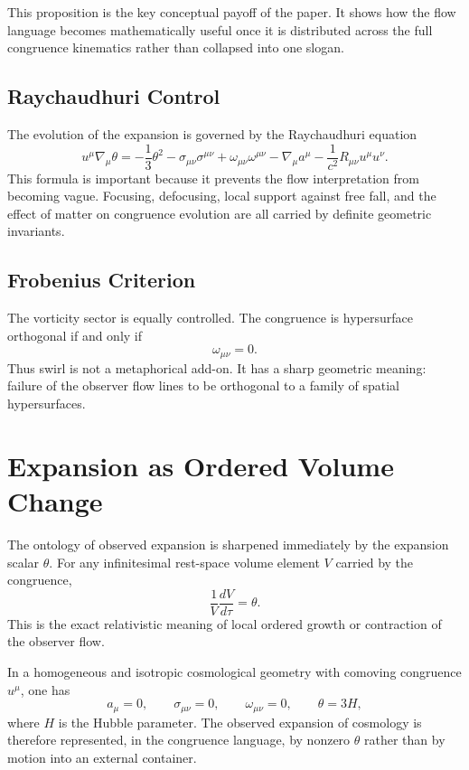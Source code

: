 \documentclass[11pt]{article}
\begin{document}
This proposition is the key conceptual payoff of the paper. It shows how the flow language becomes mathematically useful once it is distributed across the full congruence kinematics rather than collapsed into one slogan.

\subsection{Raychaudhuri Control}

The evolution of the expansion is governed by the Raychaudhuri equation
\begin{equation}
u^\mu \nabla_\mu \theta
=
-\frac{1}{3}\theta^2
-\sigma_{\mu\nu}\sigma^{\mu\nu}
+\omega_{\mu\nu}\omega^{\mu\nu}
-\nabla_\mu a^\mu
-\frac{1}{c^2}R_{\mu\nu}u^\mu u^\nu.
\label{eq:raychaudhuri}
\end{equation}
This formula is important because it prevents the flow interpretation from becoming vague. Focusing, defocusing, local support against free fall, and the effect of matter on congruence evolution are all carried by definite geometric invariants.

\subsection{Frobenius Criterion}

The vorticity sector is equally controlled. The congruence is hypersurface orthogonal if and only if
\begin{equation}
\omega_{\mu\nu}=0.
\label{eq:frobenius}
\end{equation}
Thus swirl is not a metaphorical add-on. It has a sharp geometric meaning: failure of the observer flow lines to be orthogonal to a family of spatial hypersurfaces.

\section{Expansion as Ordered Volume Change}

The ontology of observed expansion is sharpened immediately by the expansion scalar \(\theta\). For any infinitesimal rest-space volume element \(V\) carried by the congruence,
\begin{equation}
\frac{1}{V}\frac{dV}{d\tau}=\theta.
\label{eq:volumeexpansion}
\end{equation}
This is the exact relativistic meaning of local ordered growth or contraction of the observer flow.

In a homogeneous and isotropic cosmological geometry with comoving congruence \(u^\mu\), one has
\begin{equation}
a_\mu=0,
\qquad
\sigma_{\mu\nu}=0,
\qquad
\omega_{\mu\nu}=0,
\qquad
\theta = 3H,
\label{eq:flrwtheta}
\end{equation}
where \(H\) is the Hubble parameter. The observed expansion of cosmology is therefore represented, in the congruence language, by nonzero \(\theta\) rather than by motion into an external container.
\end{document}
